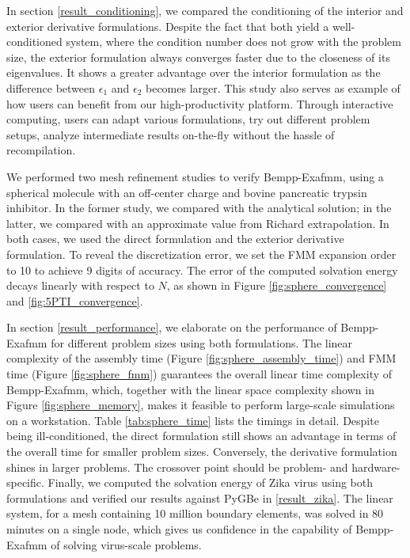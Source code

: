 In section \ref{result_conditioning}, we compared the conditioning of the interior and exterior derivative formulations.
Despite the fact that both yield a well-conditioned system, where the condition number does not grow with the problem size, the exterior formulation always converges faster due to the closeness of its eigenvalues.
It shows a greater advantage over the interior formulation as the difference between $\epsilon_1$ and $\epsilon_2$ becomes larger.
This study also serves as example of how users can benefit from our high-productivity platform.
Through interactive computing, users can adapt various formulations, try out different problem setups, analyze intermediate results on-the-fly without the hassle of recompilation.

We performed two mesh refinement studies to verify Bempp-Exafmm, using a spherical molecule with an off-center charge and bovine pancreatic trypsin inhibitor.
In the former study, we compared with the analytical solution; in the latter, we compared with an approximate value from Richard extrapolation.
In both cases, we used the direct formulation and the exterior derivative formulation.
To reveal the discretization error, we set the FMM expansion order to 10 to achieve 9 digits of accuracy.
The error of the computed solvation energy decays linearly with respect to $N$, as shown in Figure \ref{fig:sphere_convergence} and \ref{fig:5PTI_convergence}.

In section \ref{result_performance}, we elaborate on the performance of Bempp-Exafmm for different problem sizes using both formulations.
The linear complexity of the assembly time (Figure \ref{fig:sphere_assembly_time}) and FMM time (Figure \ref{fig:sphere_fmm}) guarantees the overall linear time complexity of Bempp-Exafmm, which, together with the linear space complexity shown in Figure \ref{fig:sphere_memory}, makes it feasible to perform large-scale simulations on a workstation.
Table \ref{tab:sphere_time} lists the timings in detail.
Despite being ill-conditioned, the direct formulation still shows an advantage in terms of the overall time for smaller problem sizes.
Conversely, the derivative formulation shines in larger problems.
The crossover point should be problem- and hardware-specific.
Finally, we computed the solvation energy of Zika virus using both formulations and verified our results against PyGBe in \ref{result_zika}.
The linear system, for a mesh containing 10 million boundary elements, was solved in 80 minutes on a single node, which gives us confidence in the capability of Bempp-Exafmm of solving virus-scale problems.


